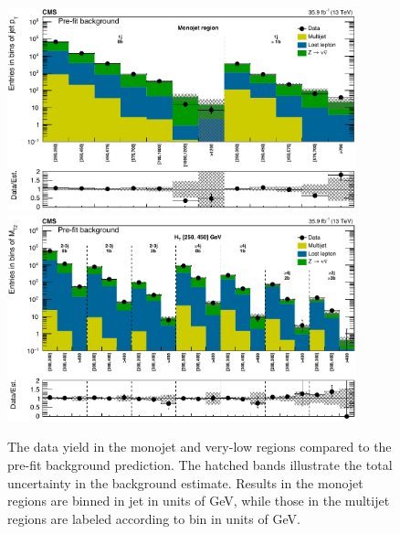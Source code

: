 \begin{figure}
	\centering
	\includegraphics[width=0.90\textwidth]{results/figs/mt2_monojet_fullEstimate}
	\includegraphics[width=0.90\textwidth]{results/figs/mt2_veryLowHT_fullEstimate}
	\caption{The data yield in the monojet and very-low \HT regions compared to the pre-fit background prediction. The hatched bands illustrate the total uncertainty in the background estimate. Results in the monojet regions are binned in jet \pt in units of GeV, while those in the multijet regions are labeled according to \mttwo bin in units of GeV.}
	\label{fig:yieldPrefit1}
\end{figure}
